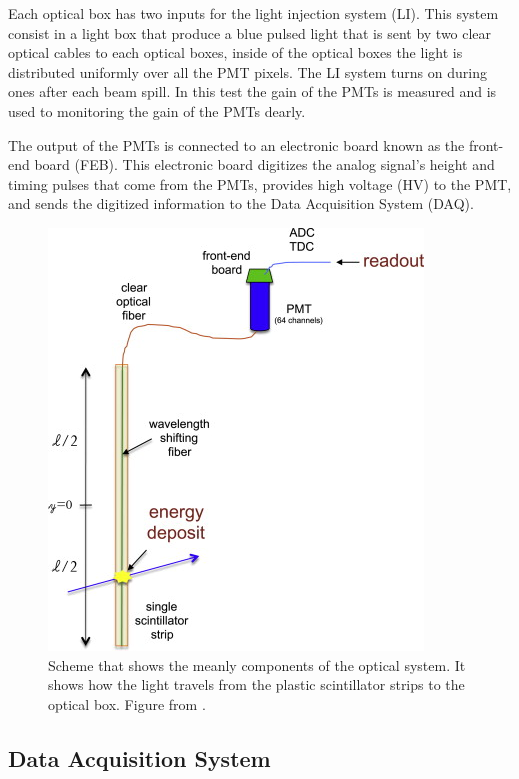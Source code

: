 Each optical box has two inputs for the light injection system (LI). This system consist in a light box that produce a blue pulsed light that is sent by two clear optical cables to each optical boxes, inside of the optical boxes the light is distributed uniformly over all the PMT pixels. The LI system turns on during ones after each beam spill. In this test the gain of the PMTs is measured and is used to monitoring the gain of the PMTs dearly. 

The output of the PMTs is connected to an electronic board known as the front-end board (FEB). This electronic board digitizes the analog signal's height and timing pulses that come from the PMTs, provides high voltage (HV) to the PMT, and sends the digitized information to the Data Acquisition System (DAQ). 

\begin{figure}
    \centering
    \includegraphics{Figures/Chapter2/OpticalSystem.jpg}
    \caption{Scheme that shows the meanly components of the optical system. It shows how the light travels from the plastic scintillator strips to the optical box. Figure from \cite{ALIAGA2014130}.}
    \label{fig:MnvExp:MnvDetector:OpticalSystem}
\end{figure}

\subsection{Data Acquisition System }
\label{Cap:MnvExp:MnvDetector:DAQ}

